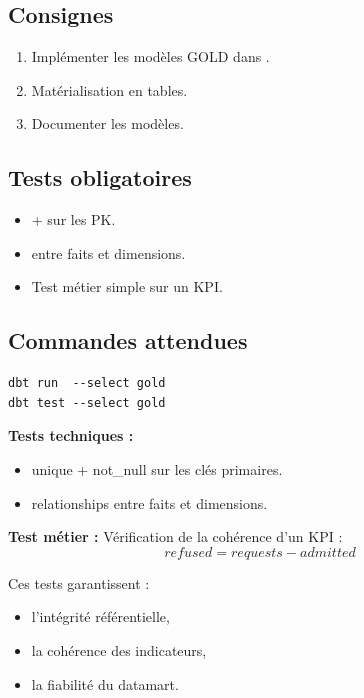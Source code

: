\documentclass[11pt,a4paper]{article}
\begin{document}
\subsection*{Consignes}

\begin{enumerate}
  \item Implémenter les modèles GOLD dans .
  \item Matérialisation en tables.
  \item Documenter les modèles.
\end{enumerate}

\subsection*{Tests obligatoires}

\begin{itemize}
  \item {} +  sur les PK.
  \item {} entre faits et dimensions.
  \item Test métier simple sur un KPI.
\end{itemize}

\subsection*{Commandes attendues}

\begin{lstlisting}
dbt run  --select gold
dbt test --select gold
\end{lstlisting}

\begin{tcolorbox}[title=\textbf{Stratégie de tests dbt :}, colback=gray!5, colframe=black, boxrule=0.8pt, arc=2mm]

\textbf{Tests techniques :}
\begin{itemize}
\item unique + not\_null sur les clés primaires.
\item relationships entre faits et dimensions.
\end{itemize}

\textbf{Test métier :}
Vérification de la cohérence d’un KPI :
\[
refused = requests - admitted
\]

Ces tests garantissent :
\begin{itemize}
\item l’intégrité référentielle,
\item la cohérence des indicateurs,
\item la fiabilité du datamart.
\end{itemize}

\end{tcolorbox}
\end{document}
